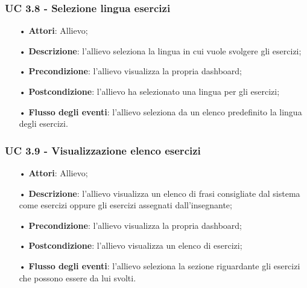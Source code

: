 \subsubsection{UC 3.8 - Selezione lingua esercizi}
\begin{itemize}
	\item[•]\textbf{Attori}: Allievo;
	\item[•]\textbf{Descrizione}: l'allievo seleziona la lingua in cui vuole svolgere gli esercizi;
	\item[•]\textbf{Precondizione}: l'allievo visualizza la propria dashboard;
	\item[•]\textbf{Postcondizione}: l'allievo ha selezionato una lingua per gli esercizi;
	\item[•]\textbf{Flusso degli eventi}: l'allievo seleziona da un elenco predefinito la lingua degli esercizi.
\end{itemize}

\subsubsection{UC 3.9 - Visualizzazione elenco esercizi}
\begin{itemize}
\item[•]\textbf{Attori}: Allievo;
\item[•]\textbf{Descrizione}:  l'allievo visualizza un elenco di frasi consigliate dal sistema come esercizi oppure gli esercizi assegnati dall'insegnante;
\item[•]\textbf{Precondizione}: l'allievo visualizza la propria dashboard;
\item[•]\textbf{Postcondizione}: l'allievo visualizza un elenco di esercizi;
\item[•]\textbf{Flusso degli eventi}: l'allievo seleziona la sezione riguardante gli esercizi che possono essere da lui svolti.
\end{itemize}

